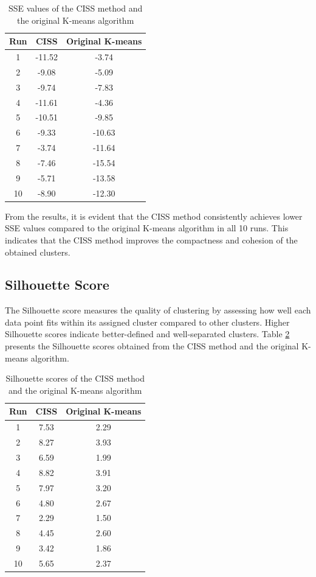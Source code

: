 \documentclass[10pt,twocolumn,a4paper]{article}
\begin{document}
\begin{table}[ht]
  \centering
  \caption{SSE values of the CISS method and the original K-means algorithm}
  \label{table:sse}
  \begin{tabular}{ccc}
    \hline
    Run & CISS & Original K-means \\
    \hline
    1   & -11.52 & -3.74 \\
    2   & -9.08  & -5.09 \\
    3   & -9.74  & -7.83 \\
    4   & -11.61 & -4.36 \\
    5   & -10.51 & -9.85 \\
    6   & -9.33  & -10.63 \\
    7   & -3.74  & -11.64 \\
    8   & -7.46  & -15.54 \\
    9   & -5.71  & -13.58 \\
    10  & -8.90  & -12.30 \\
    \hline
  \end{tabular}
\end{table}

From the results, it is evident that the CISS method consistently achieves lower SSE values compared to the original K-means algorithm in all 10 runs. This indicates that the CISS method improves the compactness and cohesion of the obtained clusters.

\subsection{Silhouette Score}

The Silhouette score measures the quality of clustering by assessing how well each data point fits within its assigned cluster compared to other clusters. Higher Silhouette scores indicate better-defined and well-separated clusters. Table \ref{table:silhouette} presents the Silhouette scores obtained from the CISS method and the original K-means algorithm.

\begin{table}[ht]
  \centering
  \caption{Silhouette scores of the CISS method and the original K-means algorithm}
  \label{table:silhouette}
  \begin{tabular}{ccc}
    \hline
    Run & CISS & Original K-means \\
    \hline
    1   & 7.53 & 2.29 \\
    2   & 8.27 & 3.93 \\
    3   & 6.59 & 1.99 \\
    4   & 8.82 & 3.91 \\
    5   & 7.97 & 3.20 \\
    6   & 4.80 & 2.67 \\
    7   & 2.29 & 1.50 \\
    8   & 4.45 & 2.60 \\
    9   & 3.42 & 1.86 \\
    10  & 5.65 & 2.37 \\
    \hline
  \end{tabular}
\end{table}
\end{document}
